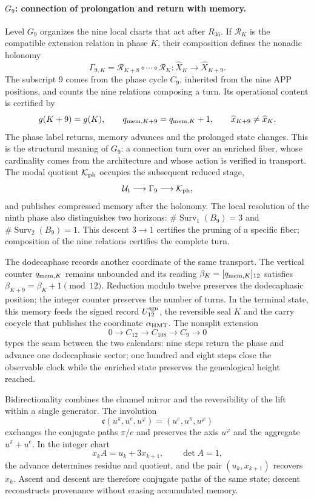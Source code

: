 \paragraph{\(G_9\): connection of prolongation and return with memory.}
Level \(G_9\) organizes the nine local charts that act after
\(R_{36}\). If \(\mathcal R_K\) is the compatible extension relation in
phase \(K\), their composition defines the nonadic holonomy
\[
 \Gamma_{9,K}
 =\mathcal R_{K+8}\circ\cdots\circ\mathcal R_K:
 \widehat X_K\longrightarrow\widehat X_{K+9}.
\]
The subscript \(9\) comes from the phase cycle \(C_9\), inherited from the nine
APP positions, and counts the nine relations composing a turn. Its
operational content is certified by
\[
 g(K+9)=g(K),\qquad
 q_{{\rm mem},K+9}=q_{{\rm mem},K}+1,
 \qquad
 \widehat x_{K+9}\ne\widehat x_K.
\]
The phase label returns, memory advances and the prolonged state changes.
This is the structural meaning of \(G_9\): a connection turn over
an enriched fiber, whose cardinality comes from the architecture and whose
action is verified in transport. The modal quotient \(\mathcal K_{\rm ph}\)
occupies the subsequent reduced stage,
\[
 \mathcal U_t\longrightarrow\Gamma_9\longrightarrow\mathcal K_{\rm ph},
\]
and publishes compressed memory after the holonomy.
The local resolution of the ninth phase also distinguishes two horizons:
\(\#\operatorname{Surv}_1(B_9)=3\) and
\(\#\operatorname{Surv}_2(B_9)=1\). This descent \(3\to1\) certifies the
pruning of a specific fiber; composition of the nine relations certifies
the complete turn.

The dodecaphase records another coordinate of the same transport. The vertical
counter \(q_{{\rm mem},K}\) remains unbounded and its reading
\(\beta_K=[q_{{\rm mem},K}]_{12}\) satisfies
\(\beta_{K+9}=\beta_K+1\pmod{12}\). Reduction modulo twelve preserves the
dodecaphasic position; the integer counter preserves the number of turns. In
the terminal state, this memory feeds the signed record
\(U_{12}^{\rm sgn}\), the reversible seal \(K\) and the carry cocycle that
publishes the coordinate \(\alpha_{\rm HMT}\).
The nonsplit extension
\[
 0\longrightarrow C_{12}\longrightarrow C_{108}
 \longrightarrow C_9\longrightarrow0
\]
types the seam between the two calendars: nine steps return the phase and
advance one dodecaphasic sector; one hundred and eight steps close the observable clock
while the enriched state preserves the genealogical height reached.

Bidirectionality combines the channel mirror and the reversibility of the
lift within a single generator. The involution
\[
 \mathfrak c(u^\pi,u^e,u^\varphi)
 =(u^e,u^\pi,u^\varphi)
\]
exchanges the conjugate paths \(\pi/e\) and preserves the axis
\(u^\varphi\) and the aggregate \(u^\pi+u^e\). In the integer chart
\[
 x_kA=u_k+3x_{k+1},\qquad \det A=1,
\]
the advance determines residue and quotient, and the pair \((u_k,x_{k+1})\) recovers
\(x_k\). Ascent and descent are therefore conjugate paths of the same state;
descent reconstructs provenance without erasing accumulated memory.

